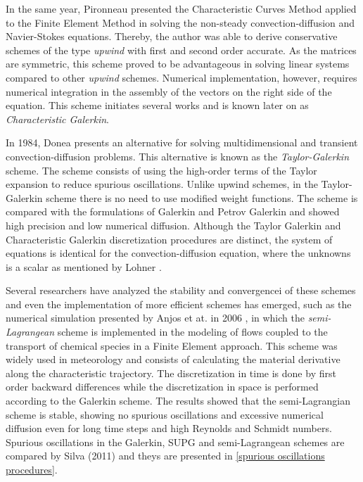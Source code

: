 \medskip
In the same year, Pironneau \cite{pironneau1982} presented
 the Characteristic Curves Method applied to the
 Finite Element Method in solving the non-steady convection-diffusion
 and Navier-Stokes equations. Thereby, the author was able
 to derive conservative schemes of the type \textit{upwind}
 with first and second order accurate. As the matrices are symmetric,
 this scheme proved to be advantageous in solving linear
 systems compared to other \textit{upwind} schemes.
 Numerical implementation, however, requires numerical integration
 in the assembly of the vectors on the right side of the equation.
 This scheme initiates several works and is known later on as
 \textit {Characteristic Galerkin}.


\medskip
In 1984, Donea \cite{donea1984} presents an alternative for
 solving multidimensional and transient convection-diffusion
 problems. This alternative is known as the
 \textit{Taylor-Galerkin} scheme. The scheme consists of using
 the high-order terms of the Taylor expansion to reduce
 spurious oscillations. Unlike upwind schemes, in the
 Taylor-Galerkin scheme there is no need to use modified
 weight functions. The scheme is compared with the formulations
 of Galerkin and Petrov Galerkin and showed high precision and
 low numerical diffusion. Although the Taylor Galerkin and
 Characteristic Galerkin discretization procedures are distinct,
 the system of equations is identical for the convection-diffusion
 equation, where the unknowns is a scalar as mentioned by
 Lohner \cite{lohner1984}.

\medskip
Several researchers have analyzed the stability and convergencei
 of these schemes and even the implementation of more efficient
 schemes has emerged, such as the numerical simulation presented
 by Anjos et at. in 2006 \cite{anjos2006}, in which the
 \textit{semi-Lagrangean} scheme is implemented in the modeling
 of flows coupled to the transport of chemical species in
 a Finite Element approach. This scheme was widely used in
 meteorology and consists of calculating the material derivative
 along the characteristic trajectory. The discretization in time
 is done by first order backward differences while
 the discretization in space is performed according to
 the Galerkin scheme. The results showed that
 the semi-Lagrangian scheme is stable, showing no spurious
 oscillations and excessive numerical diffusion even
 for long time steps and high Reynolds and Schmidt numbers.
 Spurious oscillations in the Galerkin, SUPG and semi-Lagrangean
 schemes are compared by Silva (2011) \cite{silva2011} and
 theys are presented in \ref{spurious oscillations procedures}.


